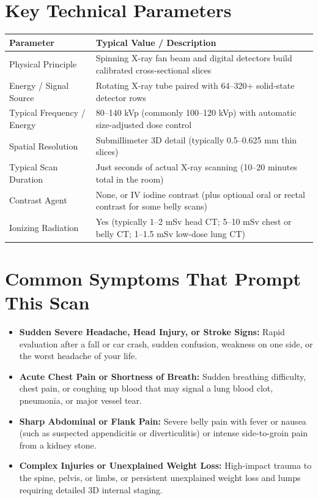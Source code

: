 \section{Key Technical Parameters}
\noindent
\begin{tabularx}{\textwidth}{@{}l X@{}}
\toprule
\textbf{Parameter} & \textbf{Typical Value / Description} \\
\midrule
Physical Principle & Spinning X-ray fan beam and digital detectors build calibrated cross-sectional slices \\
Energy / Signal Source & Rotating X-ray tube paired with 64--320+ solid-state detector rows \\
Typical Frequency / Energy & 80--140 kVp (commonly 100--120 kVp) with automatic size-adjusted dose control \\
Spatial Resolution & Submillimeter 3D detail (typically 0.5--0.625 mm thin slices) \\
Typical Scan Duration & Just seconds of actual X-ray scanning (10--20 minutes total in the room) \\
Contrast Agent & None, or IV iodine contrast (plus optional oral or rectal contrast for some belly scans) \\
Ionizing Radiation & Yes (typically 1--2 mSv head CT; 5--10 mSv chest or belly CT; 1--1.5 mSv low-dose lung CT) \\
\bottomrule
\end{tabularx}

\section{Common Symptoms That Prompt This Scan}
\begin{itemize}
    \item \textbf{Sudden Severe Headache, Head Injury, or Stroke Signs:} Rapid evaluation after a fall or car crash, sudden confusion, weakness on one side, or the worst headache of your life.
    \item \textbf{Acute Chest Pain or Shortness of Breath:} Sudden breathing difficulty, chest pain, or coughing up blood that may signal a lung blood clot, pneumonia, or major vessel tear.
    \item \textbf{Sharp Abdominal or Flank Pain:} Severe belly pain with fever or nausea (such as suspected appendicitis or diverticulitis) or intense side-to-groin pain from a kidney stone.
    \item \textbf{Complex Injuries or Unexplained Weight Loss:} High-impact trauma to the spine, pelvis, or limbs, or persistent unexplained weight loss and lumps requiring detailed 3D internal staging.
\end{itemize}

